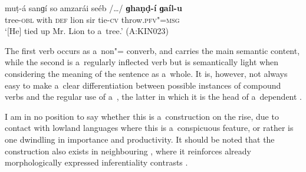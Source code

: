 \begin{exe}
\ex
\label{ex:8-27}
\gll muṭ-á sanɡí so amzarái seéb /{\ldots}/ \textbf{ɡhaṇḍ-í} \textbf{ɡaíl-u} \\
tree-\textsc{obl} with \textsc{def} lion sir {} tie-\textsc{cv} throw.\textsc{pfv"=msg} \\
\glt `[He] tied up Mr. Lion to a~tree.' (A:KIN023)
\end{exe}

The first verb occurs as a~non"= converb, and carries the main semantic content, while the second is a~regularly inflected  verb but is semantically light when considering the meaning of the sentence as a~whole. It is, however, not always easy to make a~clear differentiation between possible instances of compound verbs and the regular use of a~, the latter in which it is the head of a~dependent . 



I am in no position to say whether this is a~construction on the rise, due to contact with lowland languages where this is a~conspicuous feature, or rather is one dwindling in importance and productivity. It should be noted that the construction also exists in neighbouring \iliKalasha, where it reinforces already morphologically expressed inferentiality contrasts \citep[1--4]{bashir1993}.